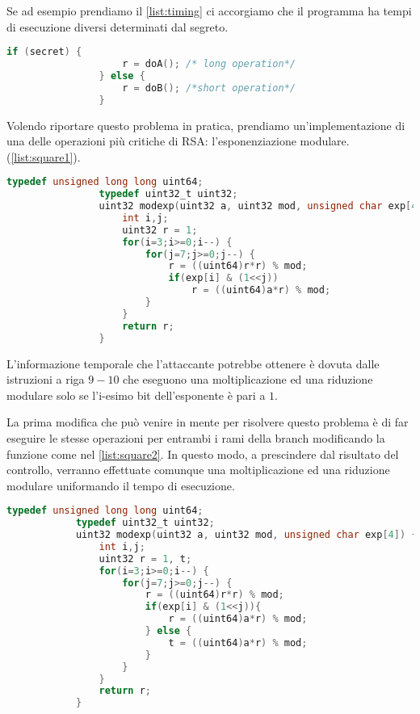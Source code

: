 		Se ad esempio prendiamo il \cref{list:timing} ci accorgiamo che il programma ha tempi di esecuzione diversi determinati dal segreto.
		
		\begin{center}
			\begin{lstlisting}[language={C},caption={Codice da proteggere},label={list:timing}]
				if (secret) {
					r = doA(); /* long operation*/
				} else {
					r = doB(); /*short operation*/
				}
			\end{lstlisting}
		\end{center}
		
		Volendo riportare questo problema in pratica, prendiamo un'implementazione di una delle operazioni più critiche di RSA: l'esponenziazione modulare. (\cref{list:square1}).
		
		\begin{center}
			\begin{lstlisting}[language={C},caption={RSA, esponenziazione modulare v1},label={list:square1}]
				typedef unsigned long long uint64;
				typedef uint32_t uint32;
				uint32 modexp(uint32 a, uint32 mod, unsigned char exp[4]) {
					int i,j;
					uint32 r = 1;
					for(i=3;i>=0;i--) {
						for(j=7;j>=0;j--) {
							r = ((uint64)r*r) % mod;
							if(exp[i] & (1<<j))
								r = ((uint64)a*r) % mod;
						}
					}
					return r;
				}
			\end{lstlisting}
		\end{center}
		
		L'informazione temporale che l'attaccante potrebbe ottenere è dovuta dalle istruzioni a riga $9-10$ che eseguono una moltiplicazione ed una riduzione modulare solo se l'i-esimo bit dell'esponente è pari a $1$.
		
		La prima modifica che può venire in mente per risolvere questo problema è di far eseguire le stesse operazioni per entrambi i rami della branch modificando la funzione come nel \cref{list:square2}. In questo modo, a prescindere dal risultato del controllo, verranno effettuate comunque una moltiplicazione ed una riduzione modulare uniformando il tempo di esecuzione.
		
		\begin{center}
			\begin{lstlisting}[language={C},caption={RSA, esponenziazione modulare v2},label={list:square2}]
			typedef unsigned long long uint64;
			typedef uint32_t uint32;
			uint32 modexp(uint32 a, uint32 mod, unsigned char exp[4]) {
				int i,j;
				uint32 r = 1, t;
				for(i=3;i>=0;i--) {
					for(j=7;j>=0;j--) {
						r = ((uint64)r*r) % mod;
						if(exp[i] & (1<<j)){
							r = ((uint64)a*r) % mod;
						} else {
							t = ((uint64)a*r) % mod;
						}
					}
				}
				return r;
			}
			\end{lstlisting}
		\end{center}
	
